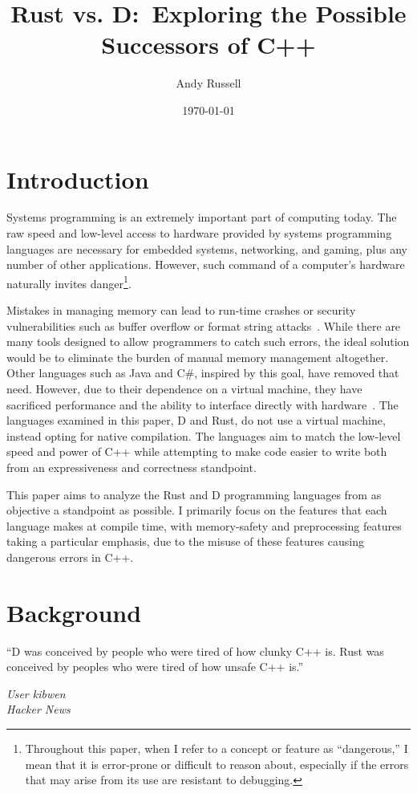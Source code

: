 \documentclass[finalcopy]{srpaper}
\title{Rust vs. D:\ Exploring the Possible Successors of C++}
\author{Andy Russell}
\date{\today}
\begin{document}
\frontmatter

\listoflistings{}

\chapter{Introduction}

Systems programming is an extremely important part of computing today. The raw
speed and low-level access to hardware provided by systems programming
languages are necessary for embedded systems, networking, and gaming, plus any
number of other applications. However, such command of a computer's hardware
naturally invites danger\footnote{Throughout this paper, when I refer to a
concept or feature as ``dangerous,'' I mean that it is error-prone or difficult
to reason about, especially if the errors that may arise from its use are
resistant to debugging.}.

Mistakes in managing memory can lead to run-time crashes or security
vulnerabilities such as buffer overflow or format string
attacks~\cite{Shahriar:2012:MPS:2187671.2187673,Seacord:2013:SCC:2530475}.
While there are many tools designed to allow programmers to catch such errors,
the ideal solution would be to eliminate the burden of manual memory management
altogether. Other languages such as Java and C\#, inspired by this goal, have
removed that need. However, due to their dependence on a virtual machine, they
have sacrificed performance and the ability to interface directly with
hardware~\cite{Alexandrescu:2010:DPL:1875434}. The languages examined in this
paper, D and Rust, do not use a virtual machine, instead opting for native
compilation. The languages aim to match the low-level speed and power of C++
while attempting to make code easier to write both from an expressiveness and
correctness standpoint.

This paper aims to analyze the Rust and D programming languages from as
objective a standpoint as possible. I primarily focus on the features that each
language makes at compile time, with memory-safety and preprocessing features
taking a particular emphasis, due to the misuse of these features causing
dangerous errors in C++.

\chapter{Background}\label{chap:background}

\epigraph{``D was conceived by people who were tired of how clunky C++ is. Rust
was conceived by peoples who were tired of how unsafe C++ is.''}{
\textit{User kibwen \\ Hacker News}}
\end{document}
